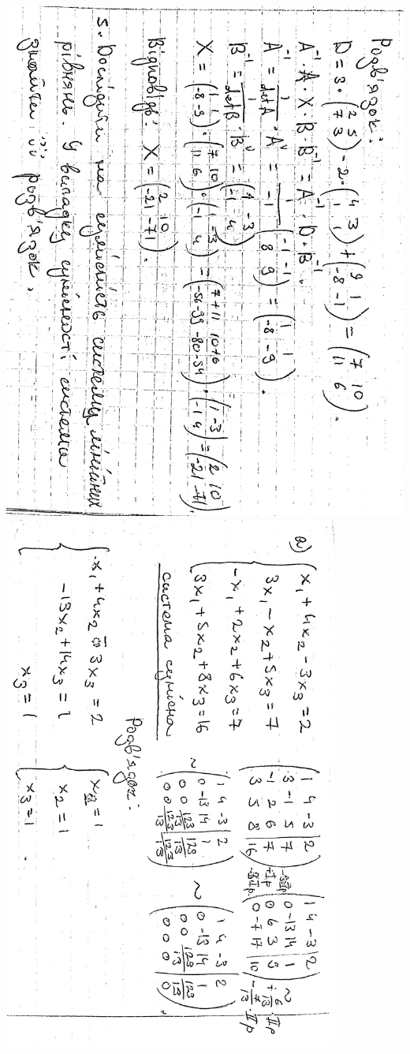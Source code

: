 \documentclass{article}
\begin{document}
\includegraphics[width=14cm,angle=90]{ons/6.jpg}\\
\includegraphics[width=11cm,angle=90]{ons/7.jpg}\\
\end{document}
